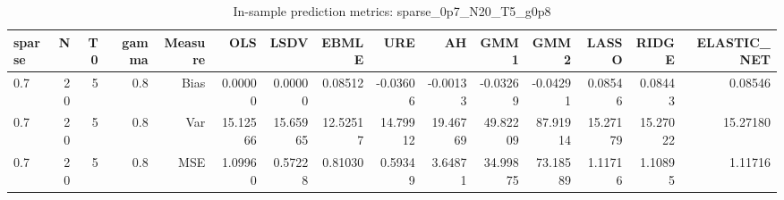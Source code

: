 \begin{table}[!htbp]\centering
\caption{In-sample prediction metrics: sparse_0p7_N20_T5_g0p8}
\label{tab:table2_sparse_0p7_N20_T5_g0p8}
\begin{tabular}{lrrrrrrrrrrrrrr}
\hline
sparse & N & T0 & gamma & Measure & OLS & LSDV & EBMLE & URE & AH & GMM1 & GMM2 & LASSO & RIDGE & ELASTIC_NET \\
\hline
0.7 & 20 & 5 & 0.8 & Bias & 0.00000 & 0.00000 & 0.08512 & -0.03606 & -0.00133 & -0.03269 & -0.04291 & 0.08546 & 0.08443 & 0.08546 \\
0.7 & 20 & 5 & 0.8 & Var & 15.12566 & 15.65965 & 12.52517 & 14.79912 & 19.46769 & 49.82209 & 87.91914 & 15.27179 & 15.27022 & 15.27180 \\
0.7 & 20 & 5 & 0.8 & MSE & 1.09960 & 0.57228 & 0.81030 & 0.59349 & 3.64871 & 34.99875 & 73.18589 & 1.11716 & 1.10895 & 1.11716 \\
\hline
\end{tabular}
\end{table}

